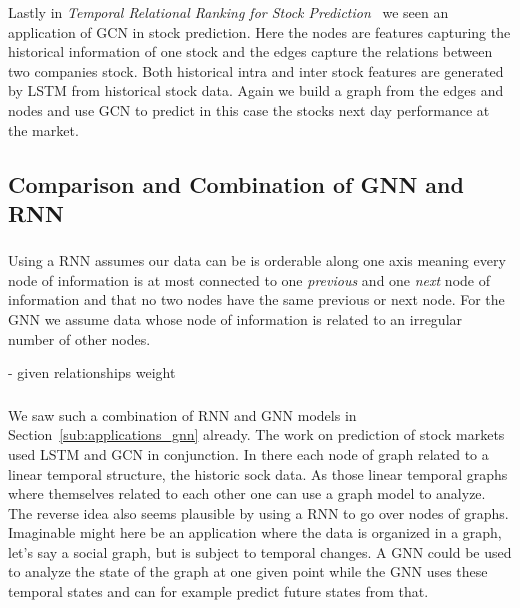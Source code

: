 \documentclass{article}
\begin{document}
Lastly in \textit{Temporal Relational Ranking for Stock Prediction}~\cite{feng2019} we seen an application of GCN in stock prediction.
Here the nodes are features capturing the historical information of one stock and the edges capture the relations between two companies stock.
Both historical intra and inter stock features are generated by LSTM from historical stock data.
Again we build a graph from the edges and nodes and use GCN to predict in this case the stocks next day performance at the market.

\subsection{Comparison and Combination of GNN and RNN}
\subsubsection{}
Using a RNN assumes our data can be is orderable along one axis meaning every node of information is at most connected to one \textit{previous} and one \textit{next} node of information and that no two nodes have the same previous or next node.
For the GNN we assume data whose node of information is related to an irregular number of other nodes.

- given relationships weight

\subsubsection{}
We saw such a combination of RNN and GNN models in Section~\ref{sub:applications_gnn} already. The work on prediction of stock markets used LSTM and GCN in conjunction.
In there each node of graph related to a linear temporal structure, the historic sock data.
As those linear temporal graphs where themselves related to each other one can use a graph model to analyze.
The reverse idea also seems plausible by using a RNN to go over nodes of graphs.
Imaginable might here be an application where the data is organized in a graph, let's say a social graph, but is subject to temporal changes.
A GNN could be used to analyze the state of the graph at one given point while the GNN uses these temporal states and can for example predict future states from that.



\end{document}
